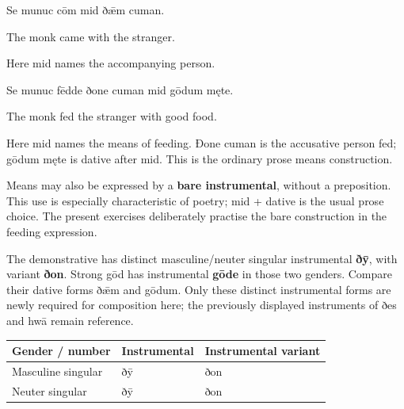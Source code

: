 Se munuc cōm mid ðǣm cuman.

The monk came with the stranger.

Here mid names the accompanying person.

Se munuc fēdde ðone cuman mid gōdum męte.

The monk fed the stranger with good food.

Here mid names the means of feeding. Ðone cuman is the accusative person fed; gōdum męte is dative after mid. This is the ordinary prose means construction.

Means may also be expressed by a \textbf{bare instrumental}, without a preposition. This use is especially characteristic of poetry; mid + dative is the usual prose choice. The present exercises deliberately practise the bare construction in the feeding expression.

The demonstrative has distinct masculine/\allowbreak{}neuter singular instrumental \textbf{ðȳ}, with variant \textbf{ðon}. Strong gōd has instrumental \textbf{gōde} in those two genders. Compare their dative forms ðǣm and gōdum. Only these distinct instrumental forms are newly required for composition here; the previously displayed instruments of ðes and hwā remain reference.

\par\begingroup
\fontsize{10.5}{13.2}\selectfont
\setlength{\LTleft}{0pt}\setlength{\LTright}{\fill}
\noindent
\begin{tabular}{@{}>{\raggedright\arraybackslash}p{38.0mm}>{\raggedright\arraybackslash}p{34.94mm}>{\raggedright\arraybackslash}p{45.43mm}@{}}
\toprule
\textbf{Gender /\allowbreak{} number} & \textbf{Instrumental} & \textbf{Instrumental variant} \\
\midrule
Masculine singular & ðȳ & ðon \\
Neuter singular & ðȳ & ðon \\
\bottomrule
\end{tabular}
\par\endgroup

